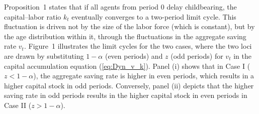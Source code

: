 \documentclass[nogrid]{MBE}%
\begin{document}
{%

Proposition~1 states that if all agents from period 0 delay childbearing, the capital--labor ratio
$k_{t}$ eventually converges to a two-period limit cycle. This fluctuation is driven not by the
size of the labor force (which is constant), but by the age distribution within it, through the
fluctuations in the aggregate saving rate $v_{t}$. Figure~1 illustrates the limit cycles for the
two cases, where the two loci are drawn by substituting $1-\alpha$ (even periods) and $z$ (odd
periods) for $v_{t}$ in the capital accumulation equation (\ref{eq:Dyn_v_k}). Panel (i) shows that
in Case I ($z<1-\alpha$), the aggregate saving rate is higher in even periods, which results in a
higher capital stock in odd periods. Conversely, panel (ii) depicts that the higher saving rate in
odd periods results in the higher capital stock in even periods in Case II ($z>1-\alpha$).

}
\end{document}
